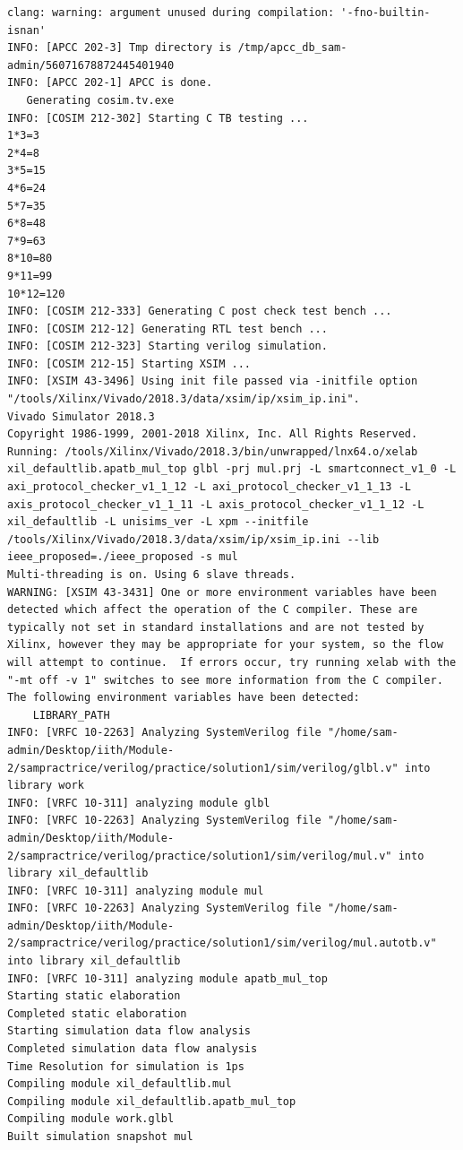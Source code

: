 \documentclass{article}
\begin{document}
\begin{lstlisting}
clang: warning: argument unused during compilation: '-fno-builtin-isnan'
INFO: [APCC 202-3] Tmp directory is /tmp/apcc_db_sam-admin/56071678872445401940
INFO: [APCC 202-1] APCC is done.
   Generating cosim.tv.exe
INFO: [COSIM 212-302] Starting C TB testing ... 
1*3=3
2*4=8
3*5=15
4*6=24
5*7=35
6*8=48
7*9=63
8*10=80
9*11=99
10*12=120
INFO: [COSIM 212-333] Generating C post check test bench ...
INFO: [COSIM 212-12] Generating RTL test bench ...
INFO: [COSIM 212-323] Starting verilog simulation. 
INFO: [COSIM 212-15] Starting XSIM ...
INFO: [XSIM 43-3496] Using init file passed via -initfile option "/tools/Xilinx/Vivado/2018.3/data/xsim/ip/xsim_ip.ini".
Vivado Simulator 2018.3
Copyright 1986-1999, 2001-2018 Xilinx, Inc. All Rights Reserved.
Running: /tools/Xilinx/Vivado/2018.3/bin/unwrapped/lnx64.o/xelab xil_defaultlib.apatb_mul_top glbl -prj mul.prj -L smartconnect_v1_0 -L axi_protocol_checker_v1_1_12 -L axi_protocol_checker_v1_1_13 -L axis_protocol_checker_v1_1_11 -L axis_protocol_checker_v1_1_12 -L xil_defaultlib -L unisims_ver -L xpm --initfile /tools/Xilinx/Vivado/2018.3/data/xsim/ip/xsim_ip.ini --lib ieee_proposed=./ieee_proposed -s mul 
Multi-threading is on. Using 6 slave threads.
WARNING: [XSIM 43-3431] One or more environment variables have been detected which affect the operation of the C compiler. These are typically not set in standard installations and are not tested by Xilinx, however they may be appropriate for your system, so the flow will attempt to continue.  If errors occur, try running xelab with the "-mt off -v 1" switches to see more information from the C compiler. The following environment variables have been detected:
    LIBRARY_PATH
INFO: [VRFC 10-2263] Analyzing SystemVerilog file "/home/sam-admin/Desktop/iith/Module-2/sampractrice/verilog/practice/solution1/sim/verilog/glbl.v" into library work
INFO: [VRFC 10-311] analyzing module glbl
INFO: [VRFC 10-2263] Analyzing SystemVerilog file "/home/sam-admin/Desktop/iith/Module-2/sampractrice/verilog/practice/solution1/sim/verilog/mul.v" into library xil_defaultlib
INFO: [VRFC 10-311] analyzing module mul
INFO: [VRFC 10-2263] Analyzing SystemVerilog file "/home/sam-admin/Desktop/iith/Module-2/sampractrice/verilog/practice/solution1/sim/verilog/mul.autotb.v" into library xil_defaultlib
INFO: [VRFC 10-311] analyzing module apatb_mul_top
Starting static elaboration
Completed static elaboration
Starting simulation data flow analysis
Completed simulation data flow analysis
Time Resolution for simulation is 1ps
Compiling module xil_defaultlib.mul
Compiling module xil_defaultlib.apatb_mul_top
Compiling module work.glbl
Built simulation snapshot mul



\end{lstlisting}
\end{document}
